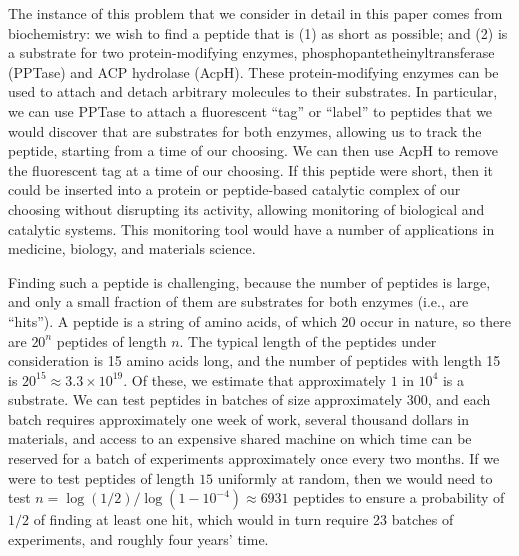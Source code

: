 \documentclass[opre,nonblindrev]{informs3} %
\begin{document}
The instance of this problem that we consider in detail in this paper comes from biochemistry: we wish to find a peptide that is (1) as short as possible; and (2) is a substrate for two protein-modifying enzymes, phosphopantetheinyltransferase (PPTase) and ACP hydrolase (AcpH). These protein-modifying enzymes can be used to attach and detach arbitrary molecules to their substrates.  In particular, we can use PPTase to attach a fluorescent ``tag'' or ``label'' to peptides that we would discover that are substrates for both enzymes, allowing us to track the peptide, starting from a time of our choosing.  We can then use AcpH to remove the fluorescent tag at a time of our choosing.  If this peptide were short, then it could be inserted into a protein or peptide-based catalytic complex of our choosing without disrupting its activity, allowing monitoring of biological and catalytic systems.  This monitoring tool would have a number of applications in medicine, biology, and materials science.

Finding such a peptide is challenging, because the number of peptides is large, and only a small fraction of them are substrates for both enzymes (i.e., are ``hits'').  A peptide is a string of amino acids, of which 20 occur in nature, so there are $20^n$ peptides of length $n$.  The typical length of the peptides under consideration is 15 amino acids long, and the number of peptides with length 15 is $20^{15} \approx 3.3 \times 10^{19}$.  Of these, we estimate that approximately $1$ in $10^4$ is a substrate. We can test peptides in batches of size approximately $300$, and each batch requires approximately one week of work, several thousand dollars in materials, and access to an expensive shared machine on which time can be reserved for a batch of experiments approximately once every two months. If we were to test peptides of length $15$ uniformly at random, then we would need to test $n = \log(1/2) / \log(1-10^{-4}) \approx 6931$ peptides to ensure a probability of $1/2$ of finding at least one hit, which would in turn require 23 batches of experiments, and roughly four years' time.



\end{document}

